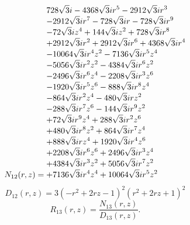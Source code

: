 \documentclass[11pt,a4paper]{article}
\begin{document}
\begin{equation}
N_{12}(r,z)=\shortstack[l]{$\displaystyle 728 \sqrt{3} i - 4368 \sqrt{3} i r^{5} - 2912 \sqrt{3} i r^{3}$\\
$\displaystyle  - 2912 \sqrt{3} i r^{7} - 728 \sqrt{3} i r - 728 \sqrt{3} i r^{9}$\\
$\displaystyle  - 72 \sqrt{3} i z^{4} + 144 \sqrt{3} i z^{2} + 728 \sqrt{3} i r^{8}$\\
$\displaystyle  + 2912 \sqrt{3} i r^{2} + 2912 \sqrt{3} i r^{6} + 4368 \sqrt{3} i r^{4}$\\
$\displaystyle  - 10064 \sqrt{3} i r^{4} z^{2} - 7136 \sqrt{3} i r^{5} z^{4}$\\
$\displaystyle  - 5056 \sqrt{3} i r^{2} z^{2} - 4384 \sqrt{3} i r^{6} z^{2}$\\
$\displaystyle  - 2496 \sqrt{3} i r^{6} z^{4} - 2208 \sqrt{3} i r^{3} z^{6}$\\
$\displaystyle  - 1920 \sqrt{3} i r^{5} z^{6} - 888 \sqrt{3} i r^{8} z^{4}$\\
$\displaystyle  - 864 \sqrt{3} i r^{2} z^{4} - 480 \sqrt{3} i r z^{2}$\\
$\displaystyle  - 288 \sqrt{3} i r^{7} z^{6} - 144 \sqrt{3} i r^{9} z^{2}$\\
$\displaystyle  + 72 \sqrt{3} i r^{9} z^{4} + 288 \sqrt{3} i r^{2} z^{6}$\\
$\displaystyle  + 480 \sqrt{3} i r^{8} z^{2} + 864 \sqrt{3} i r^{7} z^{4}$\\
$\displaystyle  + 888 \sqrt{3} i r z^{4} + 1920 \sqrt{3} i r^{4} z^{6}$\\
$\displaystyle  + 2208 \sqrt{3} i r^{6} z^{6} + 2496 \sqrt{3} i r^{3} z^{4}$\\
$\displaystyle  + 4384 \sqrt{3} i r^{3} z^{2} + 5056 \sqrt{3} i r^{7} z^{2}$\\
$\displaystyle  + 7136 \sqrt{3} i r^{4} z^{4} + 10064 \sqrt{3} i r^{5} z^{2}$}
\label{eq:cat-numerator-12}
\end{equation}
\begin{equation}
D_{12}(r,z)=3 \left(- r^{2} + 2 r z - 1\right)^{2} \left(r^{2} + 2 r z + 1\right)^{2}
\label{eq:cat-denominator-12}
\end{equation}
\begin{equation}
R_{13}(r,z)=\frac{N_{13}(r,z)}{D_{13}(r,z)}.
\label{eq:cat-rational-13}
\end{equation}
\end{document}
